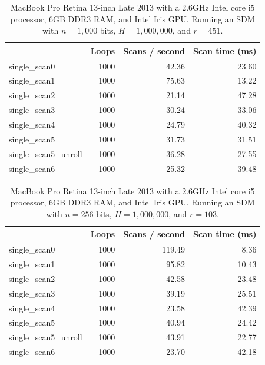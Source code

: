 \begin{table}[!htb]
\centering
\begin{tabular}{| l | r | r | r |}
    \hline
    & Loops & Scans / second & Scan time (ms) \\ \hline
    single\_scan0 & 1000 & 42.36 & 23.60 \\
    single\_scan1 & 1000 & 75.63 & 13.22 \\
    single\_scan2 & 1000 & 21.14 & 47.28 \\
    single\_scan3 & 1000 & 30.24 & 33.06 \\
    single\_scan4 & 1000 & 24.79 & 40.32 \\
    single\_scan5 & 1000 & 31.73 & 31.51 \\
    single\_scan5\_unroll & 1000 & 36.28 & 27.55 \\
    single\_scan6 & 1000 & 25.32 & 39.48 \\
\end{tabular}
\caption{MacBook Pro Retina 13-inch Late 2013 with a 2.6GHz Intel core i5 processor, 6GB DDR3 RAM, and Intel Iris GPU. Running an SDM with $n=1,000$ bits, $H=1,000,000$, and $r=451$.
\label{tab:perf-imac-256}}
\end{table}

\begin{table}[!htb]
\centering
\begin{tabular}{| l | r | r | r |}
    \hline
    & Loops & Scans / second & Scan time (ms) \\ \hline
    single\_scan0 & 1000 & 119.49 & 8.36 \\
    single\_scan1 & 1000 & 95.82 & 10.43 \\
    single\_scan2 & 1000 & 42.58 & 23.48 \\
    single\_scan3 & 1000 & 39.19 & 25.51 \\
    single\_scan4 & 1000 & 23.58 & 42.39 \\
    single\_scan5 & 1000 & 40.94 & 24.42 \\
    single\_scan5\_unroll & 1000 & 43.91 & 22.77 \\
    single\_scan6 & 1000 & 23.70 & 42.18 \\
\end{tabular}
\caption{MacBook Pro Retina 13-inch Late 2013 with a 2.6GHz Intel core i5 processor, 6GB DDR3 RAM, and Intel Iris GPU. Running an SDM with $n=256$ bits, $H=1,000,000$, and $r=103$.
\label{tab:perf-imac-256}}
\end{table}

